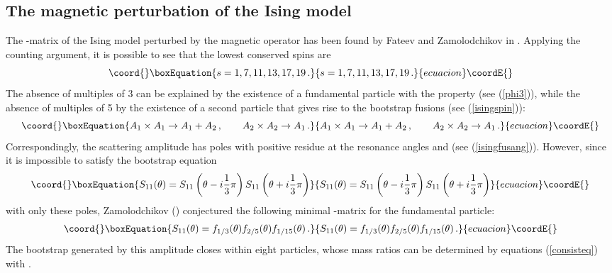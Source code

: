 \documentclass[a4paper,12pt]{report}
\begin{document}
\subsection{The magnetic perturbation of the Ising model}

The \coordHE{}-matrix of the Ising model perturbed by the magnetic operator \coordHE{} has been found by Fateev
and Zamolodchikov in \cite{fatzam}. Applying the counting argument, it is possible to see that the lowest
conserved spins are
\begin{equation}\coord{}\boxEquation{
s=1,7,11,13,17,19\,.
}{
s=1,7,11,13,17,19\,.
}{ecuacion}\coordE{}\end{equation}
The absence of multiples of 3 can be explained by the existence of a fundamental particle \coordHE{} with the
\coordHE{} property (see (\ref{phi3})), while the absence of multiples of 5 by the existence of a second particle
\coordHE{} that gives rise to the bootstrap fusions (see (\ref{isingspin})):
\begin{equation}\coord{}\boxEquation{
A_{1}\times A_{1}\rightarrow A_{1}+A_{2}\,,\qquad A_{2}\times A_{2}\rightarrow A_{1}\,.
}{
A_{1}\times A_{1}\rightarrow A_{1}+A_{2}\,,\qquad A_{2}\times A_{2}\rightarrow A_{1}\,.
}{ecuacion}\coordE{}\end{equation}
Correspondingly, the scattering amplitude \coordHE{} has poles with positive residue at the resonance angles
\coordHE{} and \coordHE{} (see (\ref{isingfusang})). However, since it is
impossible to satisfy the bootstrap equation
\begin{equation}\coord{}\boxEquation{
S_{11}(\theta)=S_{11}\left(\theta-i\frac{1}{3}\pi\right)S_{11}\left(\theta+i\frac{1}{3}\pi\right)
}{
S_{11}(\theta)=S_{11}\left(\theta-i\frac{1}{3}\pi\right)S_{11}\left(\theta+i\frac{1}{3}\pi\right)
}{ecuacion}\coordE{}\end{equation}
with only these poles, Zamolodchikov (\cite{sbrind}) conjectured the following minimal \coordHE{}-matrix for the
fundamental particle:
\begin{equation}\coord{}\boxEquation{
S_{11}(\theta)=f_{1/3}(\theta)f_{2/5}(\theta)f_{1/15}(\theta)\,.
}{
S_{11}(\theta)=f_{1/3}(\theta)f_{2/5}(\theta)f_{1/15}(\theta)\,.
}{ecuacion}\coordE{}\end{equation}
The bootstrap generated by this amplitude closes within eight particles, whose mass ratios can be determined by
equations (\ref{consisteq}) with \coordHE{}.
\end{document}
